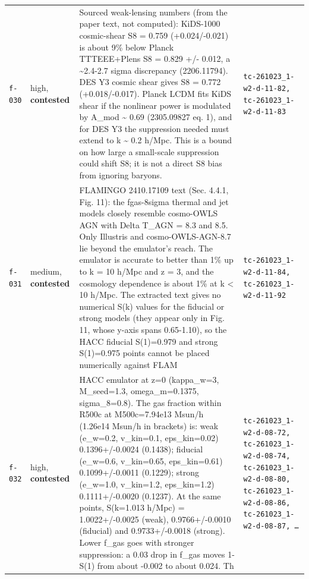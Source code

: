 \documentclass[11pt,a4paper]{article}
\begin{document}
\begin{longtable}{@{}p{}p{}p{}p{}@{}}
\texttt{f-030} & high, \textbf{contested} & Sourced weak-lensing numbers (from the paper text, not computed): KiDS-1000 cosmic-shear S8 = 0.759 (+0.024/-0.021) is about 9\% below Planck TTTEEE+Plens S8 = 0.829 +/- 0.012, a \textasciitilde{}2.4-2.7 sigma discrepancy (2206.11794). DES Y3 cosmic shear gives S8 = 0.772 (+0.018/-0.017). Planck LCDM fits KiDS shear if the nonlinear power is modulated by A\_mod \textasciitilde{} 0.69 (2305.09827 eq. 1), and for DES Y3 the suppression needed must extend to k \textasciitilde{} 0.2 h/Mpc. This is a bound on how large a small-scale suppression could shift S8; it is not a direct S8 bias from ignoring baryons. & \texttt{tc-261023\_\allowbreak{}1-w2-d-11-82,\allowbreak{} tc-261023\_\allowbreak{}1-w2-d-11-83} \\
\texttt{f-031} & medium, \textbf{contested} & FLAMINGO 2410.17109 text (Sec. 4.4.1, Fig. 11): the fgas-8sigma thermal and jet models closely resemble cosmo-OWLS AGN with Delta T\_AGN = 8.3 and 8.5. Only Illustris and cosmo-OWLS-AGN-8.7 lie beyond the emulator's reach. The emulator is accurate to better than 1\% up to k = 10 h/Mpc and z = 3, and the cosmology dependence is about 1\% at k \textless{} 10 h/Mpc. The extracted text gives no numerical S(k) values for the fiducial or strong models (they appear only in Fig. 11, whose y-axis spans 0.65-1.10), so the HACC fiducial S(1)=0.979 and strong S(1)=0.975 points cannot be placed numerically against FLAM & \texttt{tc-261023\_\allowbreak{}1-w2-d-11-84,\allowbreak{} tc-261023\_\allowbreak{}1-w2-d-11-92} \\
\texttt{f-032} & high, \textbf{contested} & HACC emulator at z=0 (kappa\_w=3, M\_seed=1.3, omega\_m=0.1375, sigma\_8=0.8). The gas fraction within R500c at M500c=7.94e13 Msun/h (1.26e14 Msun/h in brackets) is: weak (e\_w=0.2, v\_kin=0.1, eps\_kin=0.02) 0.1396+/-0.0024 (0.1438); fiducial (e\_w=0.6, v\_kin=0.65, eps\_kin=0.61) 0.1099+/-0.0011 (0.1229); strong (e\_w=1.0, v\_kin=1.2, eps\_kin=1.2) 0.1111+/-0.0020 (0.1237). At the same points, S(k=1.013 h/Mpc) = 1.0022+/-0.0025 (weak), 0.9766+/-0.0010 (fiducial) and 0.9733+/-0.0018 (strong). Lower f\_gas goes with stronger suppression: a 0.03 drop in f\_gas moves 1-S(1) from about -0.002 to about 0.024. Th & \texttt{tc-261023\_\allowbreak{}1-w2-d-08-72,\allowbreak{} tc-261023\_\allowbreak{}1-w2-d-08-74,\allowbreak{} tc-261023\_\allowbreak{}1-w2-d-08-80,\allowbreak{} tc-261023\_\allowbreak{}1-w2-d-08-86,\allowbreak{} tc-261023\_\allowbreak{}1-w2-d-08-87,\allowbreak{} \ldots{}\allowbreak{}} \\

\end{longtable}
\end{document}
